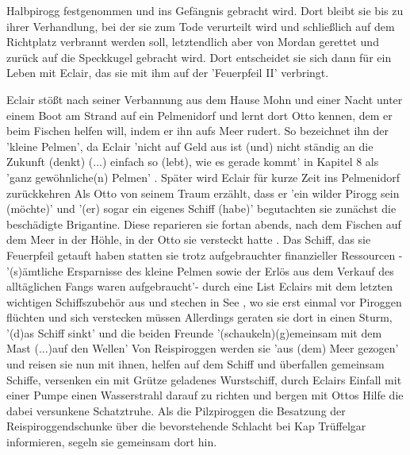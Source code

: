 Halbpirogg festgenommen\cite[S.549ff]{pir}  und ins Gefängnis gebracht wird.\cite[S.549]{pir} Dort bleibt sie bis zu ihrer Verhandlung, bei der sie zum Tode verurteilt wird\cite[S.569]{pir} und schließlich auf dem Richtplatz verbrannt werden soll, letztendlich aber von Mordan gerettet und zurück auf die Speckkugel gebracht wird.\cite[S.607]{pir} Dort entscheidet sie sich dann für ein Leben mit Eclair\cite[S.635]{pir}, das sie mit ihm auf der 'Feuerpfeil II' verbringt.\cite[S.639ff]{pir}

Eclair stößt nach seiner Verbannung aus dem Hause Mohn \cite[S.41]{pir} und einer Nacht unter einem Boot am Strand \cite[S.43]{pir} auf ein Pelmenidorf \cite[S.43]{pir} und lernt dort Otto kennen, dem er beim Fischen helfen will, indem er ihn aufs Meer rudert.\cite[S.45]{pir} So bezeichnet ihn der 'kleine Pelmen'\cite[S.45]{pir}, da Eclair 'nicht auf Geld aus ist (und) nicht ständig an die Zukunft (denkt) (...) einfach so (lebt), wie es gerade kommt' in Kapitel 8 als 'ganz gewöhnliche(n) Pelmen' \cite[S.68]{pir}. Später wird Eclair für kurze Zeit ins Pelmenidorf zurückkehren \cite[S.515ff]{pir}Als Otto von seinem Traum erzählt, dass er 'ein wilder Pirogg sein (möchte)'\cite[S.69f]{pir} und '(er) sogar ein eigenes Schiff (habe)' \cite[S.70]{pir} begutachten sie zunächst die beschädigte Brigantine\cite[S.75f]{pir}. Diese reparieren sie fortan abends, nach dem Fischen auf dem Meer\cite[S.90]{pir} in der Höhle, in der Otto sie versteckt hatte \cite[S.74f]{pir}. Das Schiff, das sie Feuerpfeil getauft haben\cite[S.92f]{pir} statten sie trotz aufgebrauchter finanzieller Ressourcen - '(s)ämtliche Ersparnisse des kleine Pelmen sowie der Erlös aus dem Verkauf des alltäglichen Fangs waren aufgebraucht'\cite[S.105]{pir}- durch eine List Eclairs mit dem letzten wichtigen Schiffszubehör aus\cite[S.106ff]{pir} und stechen in See \cite[S.136]{pir}, wo sie erst einmal vor Piroggen flüchten und sich verstecken müssen \cite[S.153ff]{pir} Allerdings geraten sie dort in einen Sturm, '(d)as Schiff sinkt' \cite[S.204]{pir} und die beiden Freunde '(schaukeln)(g)emeinsam mit dem Mast (...)auf den Wellen'\cite[S.205]{pir} Von Reispiroggen werden sie 'aus (dem) Meer gezogen'\cite[S.213]{pir} und reisen sie nun mit ihnen, helfen auf dem Schiff\cite[S.217]{pir} und überfallen gemeinsam Schiffe\cite[S.279ff]{pir}, versenken ein mit Grütze geladenes Wurstschiff,\cite[S.315]{pir} durch Eclairs Einfall mit einer Pumpe einen Wasserstrahl darauf zu richten \cite[S.310ff]{pir} und bergen mit Ottos Hilfe die dabei versunkene Schatztruhe.\cite[S.315f]{pir} Als die Pilzpiroggen die Besatzung der Reispiroggendschunke über die bevorstehende Schlacht bei Kap Trüffelgar informieren, segeln sie gemeinsam dort hin.\cite[S.318ff]{pir}
